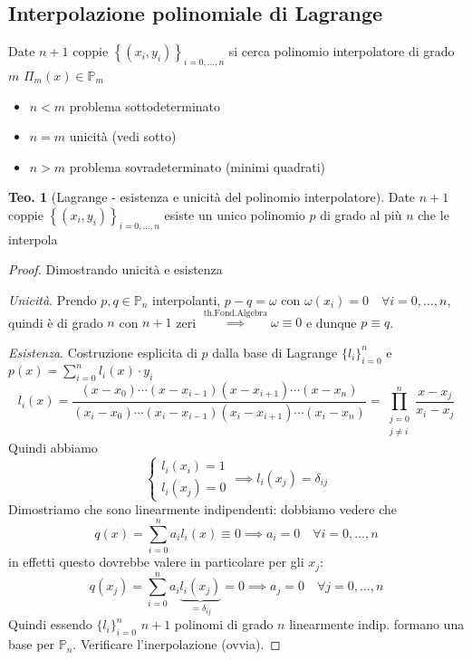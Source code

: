 \documentclass[a4paper,10pt]{article}
\theoremstyle{definition}
\theoremstyle{indentdefinition}
\theoremstyle{indenttheorem}
\newtheorem{thm}{Teo.}
\theoremstyle{myremark}
\theoremstyle{indentgeneral}
\theoremstyle{plain}
\theoremstyle{plain}
\newenvironment{myboxed} 
{\noindent\begin{lrbox}{\mybox}\begin{minipage}{\textwidth}}
{\end{minipage}\end{lrbox}\fbox{\usebox{\mybox}}}
\begin{document}
\subsection{Interpolazione polinomiale di Lagrange}
Date $n+1$ coppie $\left\{ \left(x_{i},y_{i}\right)\right\} _{i=0,\dots,n}$ si cerca polinomio interpolatore di grado $m$ $\Pi_m(x)\in\mathbb{P}_m$ 
\begin{itemize}
    \item $n<m$ problema sottodeterminato
    \item $n=m$ unicità (vedi sotto)
    \item $n>m$ problema sovradeterminato (minimi quadrati)
\end{itemize}

\begin{myboxed}
\begin{thm}[Lagrange - esistenza e unicità del polinomio interpolatore]
Date $n+1$ coppie $\left\{ \left(x_{i},y_{i}\right)\right\} _{i=0,\dots,n}$
esiste un unico polinomio $p$ di grado al più $n$ che le interpola
\end{thm}
\end{myboxed}

\begin{proof}
Dimostrando unicità e esistenza

\emph{Unicità}. Prendo $p,q\in\mathbb{P}_{n}$ interpolanti, $p-q=\omega$
con $\omega\left(x_{i}\right)=0\quad\forall i=0,\dots,n$, quindi è di grado $n$ con $n+1$ zeri $\overset{\text{th.Fond.Algebra}}{\implies}\omega\equiv0$ e dunque
$p\equiv q$.

\emph{Esistenza}. Costruzione esplicita di $p$ dalla base di Lagrange $\{l_i\}_{i=0}^n$ e 
$p\left(x\right)=\sum_{i=0}^{n}l_{i}\left(x\right)\cdot y_{i}$
\[
l_{i}\left(x\right)=\frac{\left(x-x_{0}\right)\cdots\left(x-x_{i-1}\right)\left(x-x_{i+1}\right)\cdots\left(x-x_{n}\right)}{\left(x_{i}-x_{0}\right)\cdots\left(x_{i}-x_{i-1}\right)\left(x_{i}-x_{i+1}\right)\cdots\left(x_{i}-x_{n}\right)}=\prod_{\substack{j=0\\
j\neq i
}
}^{n}\frac{x-x_{j}}{x_{i}-x_{j}}
\]
Quindi abbiamo $$\begin{cases}
    l_i(x_i)=1 \\
    l_i(x_j)=0 
\end{cases}\implies l_i(x_j)=\delta_{ij}$$
Dimostriamo che sono linearmente indipendenti: dobbiamo vedere che
$$q(x)=\sum_{i=0}^na_il_i(x)\equiv 0\implies a_i=0\quad\forall i=0,\dots,n$$
in effetti questo dovrebbe valere in particolare  per gli $x_j$:
$$q(x_j)=\sum_{i=0}^na_i\underbrace{l_i(x_j)}_{=\delta_{ij}}= 0\implies a_j=0\quad\forall j=0,\dots,n$$
Quindi essendo $\{l_i\}_{i=0}^n$ $n+1$ polinomi di grado $n$ linearmente indip. formano una base per $\mathbb{P}_n$. Verificare l'inerpolazione (ovvia).
\end{proof}
\end{document}
